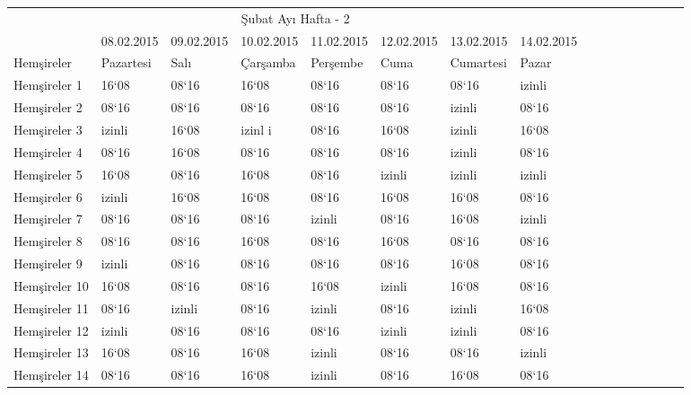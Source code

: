 \documentclass[12pt, a4paper]{article}
\begin{document}
\begin{flushleft}
\begin{center}
\begin{landscape}
\begin{table}
\begin{tabular}{|p{3cm}||p{2cm}||p{2cm}||p{3cm}||p{3cm}||p{3cm}||p{3cm}||p{2cm}|c|c|c|c|c|c|c|c|}
				\hline \multicolumn{8}{|c|}{Şubat Ayı Hafta - 2} \\
				\rowcolor{yellow}
				\hline  & 08.02.2015 & 09.02.2015 & 10.02.2015 & 11.02.2015& 12.02.2015&13.02.2015& 14.02.2015 \\
				\rowcolor{lightgray}
				\hline Hemşireler   & Pazartesi& Salı & Çarşamba & Perşembe &Cuma&Cumartesi &Pazar\\
				
				\hline Hemşireler 1 &  16`08  &  08`16 & 16`08  &  08`16  &  08`16  &   08`16   &   izinli \\
				\hline Hemşireler 2 &  08`16  &  08`16 & 08`16  &  08`16  &  08`16  &   izinli  &   08`16 \\
				\hline Hemşireler 3 &  izinli &  16`08 & izinl i&  08`16  &  16`08  &   izinli  &   16`08 \\
				\hline Hemşireler 4 &  08`16  &  16`08 & 08`16  &  08`16  &  08`16  &   izinli  &   08`16 \\
				\hline Hemşireler 5 &  16`08  &  08`16 & 16`08  &  08`16  &  izinli &   izinli  &   izinli \\
				\hline Hemşireler 6 &  izinli &  16`08 & 16`08  &  08`16  &  16`08  &   16`08   &   08`16 \\
				\hline Hemşireler 7 &  08`16  &  08`16 & 08`16  &  izinli &  08`16  &   16`08   &   izinli \\
				\hline Hemşireler 8 &  08`16  &  08`16 & 16`08  &  08`16  &  16`08  &   08`16   &   08`16 \\
				\hline Hemşireler 9 &  izinli &  08`16 & 08`16  &  08`16  &  08`16  &   16`08   &   08`16 \\
				\hline Hemşireler 10 & 16`08  &  08`16 & 08`16  &  16`08  &  izinli &   16`08   &   08`16 \\
				\hline Hemşireler 11 & 08`16  &  izinli& 08`16  &  izinli &  08`16  &   izinli  &   16`08 \\
				\hline Hemşireler 12 & izinli &  08`16 &  08`16 &  08`16  &  izinli &   izinli  &   08`16 \\
				\hline Hemşireler 13 & 16`08  &  08`16 &  16`08 &  izinli &  08`16  &   08`16   &   izinli \\
				\hline Hemşireler 14 & 08`16  &  08`16 &  16`08 &  izinli &  08`16  &   16`08   &   08`16 \\
				\hline
				
			\end{tabular}
			
		\end{table}
		

\end{landscape}
\end{center}
\end{flushleft}
\end{document}
